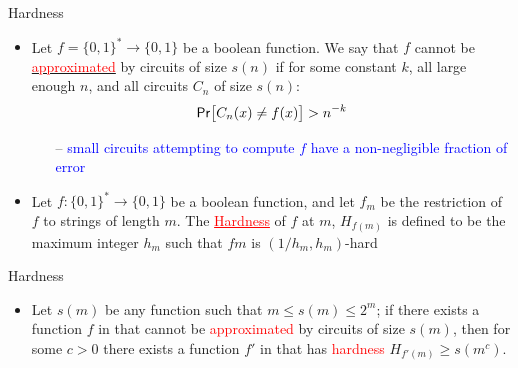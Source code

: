\documentclass[xcolor={table,dvipsnames,usenames}]{beamer}
\begin{document}
\begin{frame}{Hardness}
\begin{itemize}
	\item Let $f=\{0, 1\}^* \rightarrow \{0, 1\}$ be a boolean function. We say that $f$ cannot be \underline{\textcolor{red}{approximated}} by circuits of size $s(n)$ if for some constant $k$, all large enough $n$, and all circuits $C_n$ of size $s(n)$:
	$$ \mathsf{Pr}\big[C_n(x) \neq f(x)\big] > n^{-k}$$
	\begin{itemize}
		\item[--] \textcolor{blue}{small circuits attempting to compute $f$ have a non-negligible fraction of error}
	\end{itemize}
	\item  Let $f: \{0, 1\}^* \rightarrow \{0, 1\}$ be a boolean function, and let $f_m$ be the restriction of $f$ to strings of length $m$. The \textcolor{red}{\underline{Hardness}} of $f$ at $m$, $H_{f(m)}$ is defined to be the maximum integer $h_m$ such that $fm$ is $(1/h_m,h_m)$-hard
\end{itemize}
\end{frame}
\begin{frame}{Hardness}
\begin{itemize}
	\item  Let $s(m)$ be any function such that $m \leq s(m) \leq 2^m$; if there exists a function $f$ in {\EXPTIME} that cannot be \textcolor{red}{approximated} by circuits of size $s(m)$, then for some $c >0$ there exists a function $f'$ in {\EXPTIME} that has \textcolor{red}{hardness} $H_{f'(m)} \geq s(m^c)$.
\end{itemize}
\end{frame}
\end{document}

